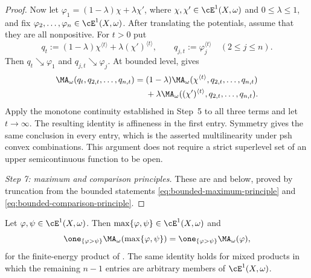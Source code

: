 \begin{proof}
Now let
$\varphi_1=(1-\lambda)\chi+\lambda\chi'$, where
$\chi,\chi'\in\cE^1(X,\omega)$ and $0\leq\lambda\leq1$, and fix
$\varphi_2,\ldots,\varphi_n\in\cE^1(X,\omega)$.  After translating the
potentials, assume that they are all nonpositive.  For $t>0$ put
\[
 q_t:=(1-\lambda)\chi^{\langle t\rangle}
             +\lambda(\chi')^{\langle t\rangle},
 \qquad
 q_{j,t}:=\varphi_j^{\langle t\rangle}\quad(2\leq j\leq n).
\]
Then $q_t\searrow\varphi_1$ and
$q_{j,t}\searrow\varphi_j$.  At bounded level,
 gives
\[
 \begin{aligned}
 \MA_\omega(q_t,q_{2,t},\ldots,q_{n,t})
  ={}&(1-\lambda)
     \MA_\omega(\chi^{\langle t\rangle},q_{2,t},\ldots,q_{n,t})\\
   &+\lambda
     \MA_\omega((\chi')^{\langle t\rangle},q_{2,t},\ldots,q_{n,t}).
 \end{aligned}
\]
Apply the monotone continuity established in Step~5 to all three terms and
let $t\to\infty$.  The resulting identity is affineness in the first
entry.  Symmetry gives the same conclusion in every entry, which is the
asserted multilinearity under psh convex combinations.  This argument does
not require a strict superlevel set of an upper semicontinuous function to
be open.

\emph{Step 7: maximum and comparison principles.}  These are
 and
 below, proved by truncation from the bounded
statements \eqref{eq:bounded-maximum-principle} and
\eqref{eq:bounded-comparison-principle}.
\end{proof}

\begin{theorem}
\label{thm:ch26-e1-maximum-principle}
Let $\varphi,\psi\in\cE^1(X,\omega)$.  Then
$\max\{\varphi,\psi\}\in\cE^1(X,\omega)$ and
\begin{equation}
\label{eq:ch26-e1-maximum-principle}
 \one_{\{\varphi>\psi\}}\MA_\omega(\max\{\varphi,\psi\})
 =\one_{\{\varphi>\psi\}}\MA_\omega(\varphi),
\end{equation}
for the finite-energy product of .  The same
identity holds for mixed products in which the remaining $n-1$ entries are
arbitrary members of $\cE^1(X,\omega)$.
\end{theorem}

